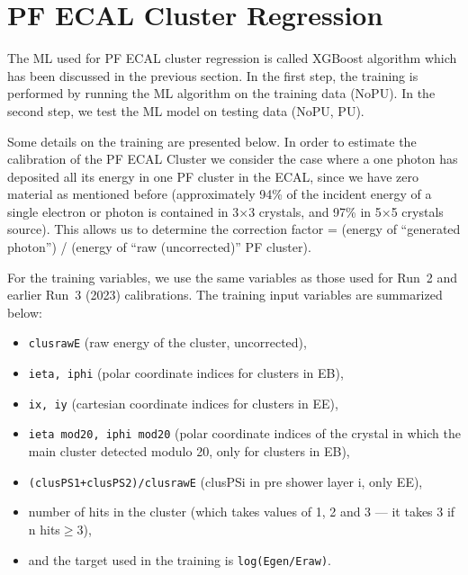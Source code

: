 \section{PF ECAL Cluster Regression}
The ML used for PF ECAL cluster regression is called XGBoost algorithm which has been discussed in the previous section.
In the first step, the training is performed by running the ML algorithm on the training data (NoPU).
In the second step, we test the ML model on testing data (NoPU, PU).

Some details on the training are presented below.
In order to estimate the calibration of the PF ECAL Cluster we consider the case where a one photon has deposited all its energy in one PF cluster in the ECAL,
since we have zero material as mentioned before (approximately 94\% of the incident energy of a single electron or photon is contained in 3$\times$3 crystals, and 97\% in 5$\times$5 crystals source).
This allows us to determine the correction factor = (energy of ``generated photon'') / (energy of ``raw (uncorrected)'' PF cluster).

For the training variables, we use the same variables as those used for Run~2 and earlier Run~3 (2023) calibrations. The training input variables are summarized below: %
\begin{itemize}
\item {\tt clusrawE} (raw energy of the cluster, uncorrected),
\item {\tt ieta, iphi} (polar coordinate indices for clusters in EB),
\item {\tt ix, iy} (cartesian coordinate indices for clusters in EE),
\item {\tt ieta mod20, iphi mod20} (polar coordinate indices of the crystal in which the main cluster detected modulo 20, only for clusters in EB),
\item {\tt (clusPS1+clusPS2)/clusrawE} (clusPSi in pre shower layer i, only EE),
\item number of hits in the cluster (which takes values of 1, 2 and 3 --- it takes 3 if n hits$\geq3$),
\item and the target used in the training is {\tt log(Egen/Eraw)}.
\end{itemize}

